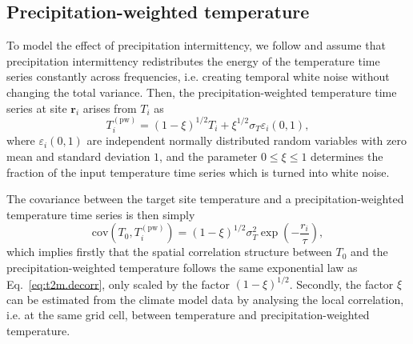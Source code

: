 \documentclass[cp, manuscript]{copernicus}
\begin{document}
\subsection{Precipitation-weighted temperature}
\label{app:concept.model.t2m.pw}

To model the effect of precipitation intermittency, we follow
\citet{Laepple2018} and assume that precipitation intermittency redistributes
the energy of the temperature time series constantly across frequencies,
i.e. creating temporal white noise without changing the total variance. Then,
the precipitation-weighted temperature time series at site $\mathbf{r}_i$ arises
from $T_i$ as
%
\begin{equation}
\label{eq:precip.weighting}
T_i^{\mathrm{(pw)}}=
\left(1-\xi\right)^{1/2}T_i + \xi^{1/2} \sigma_T \varepsilon_i(0,1),
\end{equation}
%
where $\varepsilon_i(0,1)$ are independent normally distributed random variables
with zero mean and standard deviation $1$, and the parameter $0\leq\xi\leq1$
determines the fraction of the input temperature time series which is turned
into white noise.

The covariance between the target site temperature and a precipitation-weighted
temperature time series is then simply
\begin{equation}
\label{eq:t2m.pw.decorr}
\mathrm{cov}(T_0,T_i^{\mathrm{(pw)}})=
(1-\xi)^{1/2}\sigma_T^2\exp{\left(-\frac{r_i}{\tau}\right)},
\end{equation}
%
which implies firstly that the spatial correlation structure between $T_0$ and
the precipitation-weighted temperature follows the same exponential law as
Eq.~\eqref{eq:t2m.decorr}, only scaled by the factor $(1-\xi)^{1/2}$. Secondly,
the factor $\xi$ can be estimated from the climate model data by analysing the
local correlation, i.e. at the same grid cell, between temperature and
precipitation-weighted temperature.
\end{document}
